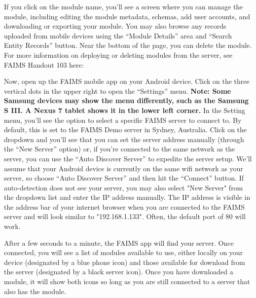 {}

If you click on the module name, you'll see a screen where you can manage the module, including editing the module metadata, schemas, add user accounts, and downloading or exporting your module. You may also browse any records uploaded from mobile devices using the “Module Details” area and “Search Entity Records” button. Near the bottom of the page, you can delete the module. For more information on deploying or deleting modules from the server, see FAIMS Handout 103 here: \from[url21]

Now, open up the FAIMS mobile app on your Android device. Click on the three vertical dots in the upper right to open the “Settings” menu. {\bf *Note: Some Samsung devices may show the menu differently, such as the Samsung S III. A Nexus 7 tablet shows it in the lower left corner.} In the Setting menu, you'll see the option to select a specific FAIMS server to connect to. By default, this is set to the FAIMS Demo server in Sydney, Australia. Click on the dropdown and you'll see that you can set the server address manually (through the “New Server” option) or, if you're connected to the same network as the server, you can use the “Auto Discover Server” to expedite the server setup. We'll assume that your Android device is currently on the same wifi network as your server, so choose “Auto Discover Server” and then hit the “Connect” button. If auto-detection does not see your server, you may also select "New Server" from the dropdown list and enter the IP address manually. The IP address is visible in the address bar of your internet browser when you are connected to the FAIMS server and will look similar to "192.168.1.133". Often, the default port of 80 will work.

{}{}

After a few seconds to a minute, the FAIMS app will find your server. Once connected, you will see a list of modules available to use, either locally on your device (designated by a blue phone icon) and those available for download from the server (designated by a black server icon). Once you have downloaded a module, it will show both icons so long as you are still connected to a server that also has the module.

